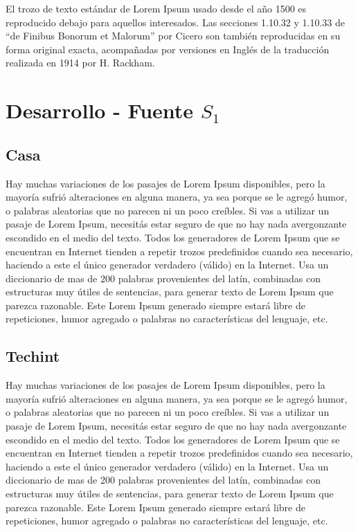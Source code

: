 \documentclass[final,narroweqnarray,inline]{ieee}
\begin{document}
El trozo de texto estándar de Lorem Ipsum usado desde el año 1500 es reproducido debajo para aquellos interesados. Las secciones 1.10.32 y 1.10.33 de ``de Finibus Bonorum et Malorum'' por Cicero son también reproducidas en su forma original exacta, acompañadas por versiones en Inglés de la traducción realizada en 1914 por H. Rackham.

\clearpage
\section{Desarrollo - Fuente $S_1$}
  \subsection{Casa}

Hay muchas variaciones de los pasajes de Lorem Ipsum disponibles, pero la mayoría sufrió alteraciones en alguna manera, ya sea porque se le agregó humor, o palabras aleatorias que no parecen ni un poco creíbles. Si vas a utilizar un pasaje de Lorem Ipsum, necesitás estar seguro de que no hay nada avergonzante escondido en el medio del texto. Todos los generadores de Lorem Ipsum que se encuentran en Internet tienden a repetir trozos predefinidos cuando sea necesario, haciendo a este el único generador verdadero (válido) en la Internet. Usa un diccionario de mas de 200 palabras provenientes del latín, combinadas con estructuras muy útiles de sentencias, para generar texto de Lorem Ipsum que parezca razonable. Este Lorem Ipsum generado siempre estará libre de repeticiones, humor agregado o palabras no características del lenguaje, etc.

  \subsection{Techint}

Hay muchas variaciones de los pasajes de Lorem Ipsum disponibles, pero la mayoría sufrió alteraciones en alguna manera, ya sea porque se le agregó humor, o palabras aleatorias que no parecen ni un poco creíbles. Si vas a utilizar un pasaje de Lorem Ipsum, necesitás estar seguro de que no hay nada avergonzante escondido en el medio del texto. Todos los generadores de Lorem Ipsum que se encuentran en Internet tienden a repetir trozos predefinidos cuando sea necesario, haciendo a este el único generador verdadero (válido) en la Internet. Usa un diccionario de mas de 200 palabras provenientes del latín, combinadas con estructuras muy útiles de sentencias, para generar texto de Lorem Ipsum que parezca razonable. Este Lorem Ipsum generado siempre estará libre de repeticiones, humor agregado o palabras no características del lenguaje, etc.
\end{document}
